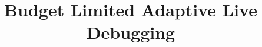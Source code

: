 \documentclass[letterpaper,twocolumn,10pt]{article}
\begin{document}
\title{Budget Limited Adaptive Live Debugging}


\maketitle


\newcommand{\iprobe}{\texttt{iProbe}\xspace}
\newcommand{\livedebugging}{\emph{Live Debugging}\xspace}
\newcommand{\parikshan}{\texttt{Parikshan}\xspace}
\newcommand{\comment}[1]{}
\newtheorem{example}{Example}
\def\infinity{\rotatebox{90}{8}}











\end{document}
